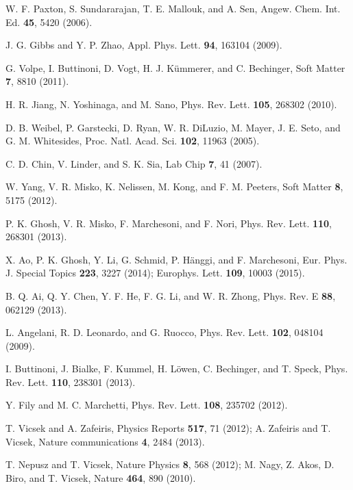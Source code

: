 \documentclass[aps,pre,preprint,superscriptaddress,amsmath,amssymb,nofootinbib]{revtex4}
\begin{document}
\begin{thebibliography}{100}
{W. F. Paxton, S. Sundararajan, T. E. Mallouk, and A. Sen}, {Angew. Chem. Int. Ed.} {\bf 45}, {5420} {(2006)}.

{J. G. Gibbs and Y. P. Zhao}, {Appl. Phys. Lett.} {\bf 94}, {163104} {(2009)}.

{G. Volpe, I. Buttinoni, D. Vogt, H. J. K\"ummerer, and C. Bechinger}, {Soft Matter} {\bf 7}, {8810} {(2011)}.

{H. R. Jiang, N. Yoshinaga, and M. Sano}, {Phys. Rev. Lett.} {\bf 105}, {268302} {(2010)}.

{D. B. Weibel, P. Garstecki, D. Ryan, W. R. DiLuzio, M. Mayer, J. E. Seto, and G. M. Whitesides}, {Proc. Natl. Acad. Sci.} {\bf 102}, {11963} {(2005)}.

{C. D. Chin, V. Linder, and S. K. Sia}, {Lab Chip} {\bf 7}, {41} {(2007)}. 

{W. Yang, V. R. Misko, K. Nelissen, M. Kong, and F. M. Peeters}, {Soft Matter} {\bf 8}, {5175} {(2012)}.

{P. K. Ghosh, V. R. Misko, F. Marchesoni, and F. Nori}, {Phys. Rev. Lett.} {\bf 110}, {268301} {(2013)}.

{X. Ao, P. K. Ghosh, Y. Li, G. Schmid, P. H\"anggi, and F. Marchesoni}, {Eur. Phys. J. Special Topics} {\bf 223}, {3227} {(2014)};
{Europhys. Lett.} {\bf 109}, {10003} {(2015)}.

{B. Q. Ai, Q. Y. Chen, Y. F. He, F. G. Li, and W. R. Zhong}, {Phys. Rev. E} {\bf 88}, {062129} {(2013)}.


{L. Angelani, R. D. Leonardo, and G. Ruocco}, {Phys. Rev. Lett.} {\bf 102}, {048104} {(2009)}. 

{I. Buttinoni, J. Bialke, F. Kummel, H. L\"owen, C. Bechinger, and T. Speck}, {Phys. Rev. Lett.} {\bf 110}, {238301} {(2013)}.

{Y. Fily and M. C. Marchetti}, {Phys. Rev. Lett.} {\bf 108}, {235702} {(2012)}.

{T. Vicsek and A. Zafeiris}, {Physics Reports} {\bf 517}, {71} {(2012)};
{A. Zafeiris and T. Vicsek}, {Nature communications} {\bf 4}, {2484} {(2013)}. 

{T. Nepusz and T. Vicsek}, {Nature Physics} {\bf 8}, {568} {(2012)};
{M. Nagy, Z. Akos, D. Biro, and T. Vicsek}, {Nature} {\bf 464}, {890} {(2010)}. 


\end{thebibliography}
\end{document}
